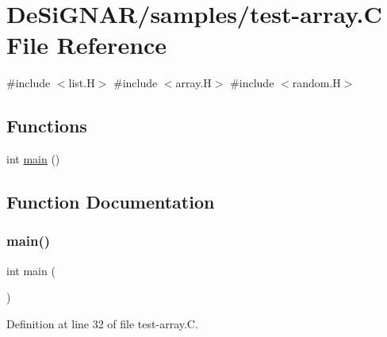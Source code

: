 \hypertarget{test-array_8_c}{}\section{De\+Si\+G\+N\+A\+R/samples/test-\/array.C File Reference}
\label{test-array_8_c}
{\ttfamily \#include $<$list.\+H$>$}\newline
{\ttfamily \#include $<$array.\+H$>$}\newline
{\ttfamily \#include $<$random.\+H$>$}\newline
\subsection*{Functions}
\begin{DoxyCompactItemize}
\item 
int \hyperlink{test-array_8_c_ae66f6b31b5ad750f1fe042a706a4e3d4}{main} ()
\end{DoxyCompactItemize}


\subsection{Function Documentation}
\mbox{\label{test-array_8_c_ae66f6b31b5ad750f1fe042a706a4e3d4}} 
\subsubsection{\texorpdfstring{main()}{main()}}
{\footnotesize\ttfamily int main (\begin{DoxyParamCaption}{ }\end{DoxyParamCaption})}



Definition at line 32 of file test-\/array.\+C.

